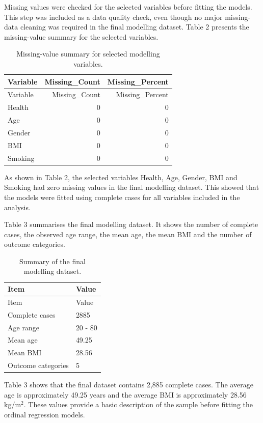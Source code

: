 \documentclass{article}
\begin{document}
Missing values were checked for the selected variables before fitting
the models. This step was included as a data quality check, even though
no major missing-data cleaning was required in the final modelling
dataset. Table 2 presents the missing-value summary for the selected
variables.

\begin{longtable}[]{@{}lrr@{}}
\caption{Missing-value summary for selected modelling
variables.}\tabularnewline
\toprule\noalign{}
Variable & Missing\_Count & Missing\_Percent \\
\midrule\noalign{}
\endfirsthead
\toprule\noalign{}
Variable & Missing\_Count & Missing\_Percent \\
\midrule\noalign{}
\endhead
\bottomrule\noalign{}
\endlastfoot
Health & 0 & 0 \\
Age & 0 & 0 \\
Gender & 0 & 0 \\
BMI & 0 & 0 \\
Smoking & 0 & 0 \\
\end{longtable}

As shown in Table 2, the selected variables Health, Age, Gender, BMI and
Smoking had zero missing values in the final modelling dataset. This
showed that the models were fitted using complete cases for all
variables included in the analysis.

Table 3 summarises the final modelling dataset. It shows the number of
complete cases, the observed age range, the mean age, the mean BMI and
the number of outcome categories.

\begin{longtable}[]{@{}ll@{}}
\caption{Summary of the final modelling dataset.}\tabularnewline
\toprule\noalign{}
Item & Value \\
\midrule\noalign{}
\endfirsthead
\toprule\noalign{}
Item & Value \\
\midrule\noalign{}
\endhead
\bottomrule\noalign{}
\endlastfoot
Complete cases & 2885 \\
Age range & 20 - 80 \\
Mean age & 49.25 \\
Mean BMI & 28.56 \\
Outcome categories & 5 \\
\end{longtable}

Table 3 shows that the final dataset contains 2,885 complete cases. The
average age is approximately 49.25 years and the average BMI is
approximately 28.56 kg/m\(^2\). These values provide a basic description
of the sample before fitting the ordinal regression models.
\end{document}
